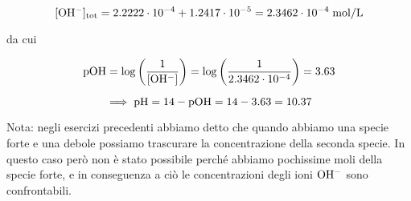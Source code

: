 \begin{soluzione}
$$\rm [OH^-]_{tot}=2.2222 \cdot 10^{-4} + 1.2417 \cdot 10^{-5}
=2.3462 \cdot 10^{-4} \; mol/L$$

da cui

$$\rm pOH=\log{\left(\frac{1}{[OH^-]}\right)}
=\log{\left(\frac{1}{2.3462 \cdot 10^{-4}}\right)}=3.63$$

$$\implies \rm pH=14-pOH=14-3.63=10.37$$

Nota: negli esercizi precedenti abbiamo detto che quando abbiamo una specie forte e una debole possiamo trascurare la concentrazione della seconda specie. In questo caso però non è stato possibile perché abbiamo pochissime moli della specie forte, e in conseguenza a ciò le concentrazioni degli ioni $\rm OH^-$ sono confrontabili.

\end{soluzione}

\newpage

